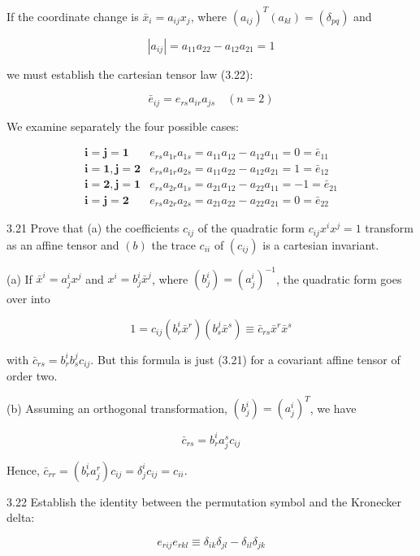 \documentclass[10pt]{article}
\begin{document}
If the coordinate change is $\bar{x}_{i}=a_{i j} x_{j}$, where $\left(a_{i j}\right)^{T}\left(a_{k l}\right)=\left(\delta_{p q}\right)$ and

$$
\left|a_{i j}\right|=a_{11} a_{22}-a_{12} a_{21}=1
$$

we must establish the cartesian tensor law (3.22):

$$
\bar{e}_{i j}=e_{r s} a_{i r} a_{j s} \quad(n=2)
$$

We examine separately the four possible cases:

$$
\begin{aligned}
\boldsymbol{i}=\boldsymbol{j}=\mathbf{1} & e_{r s} a_{1 r} a_{1 s}=a_{11} a_{12}-a_{12} a_{11}=0=\bar{e}_{11} \\
\boldsymbol{i}=\mathbf{1}, \boldsymbol{j}=\mathbf{2} & e_{r s} a_{1 r} a_{2 s}=a_{11} a_{22}-a_{12} a_{21}=1=\bar{e}_{12} \\
\boldsymbol{i}=\mathbf{2}, \boldsymbol{j}=\mathbf{1} & e_{r s} a_{2 r} a_{1 s}=a_{21} a_{12}-a_{22} a_{11}=-1=\bar{e}_{21} \\
\boldsymbol{i}=\boldsymbol{j}=\mathbf{2} & e_{r s} a_{2 r} a_{2 s}=a_{21} a_{22}-a_{22} a_{21}=0=\bar{e}_{22}
\end{aligned}
$$

3.21 Prove that (a) the coefficients $c_{i j}$ of the quadratic form $c_{i j} x^{i} x^{j}=1$ transform as an affine tensor and $(b)$ the trace $c_{i i}$ of $\left(c_{i j}\right)$ is a cartesian invariant.

(a) If $\bar{x}^{i}=a_{j}^{i} x^{j}$ and $x^{i}=b_{j}^{i} \bar{x}^{j}$, where $\left(b_{j}^{i}\right)=\left(a_{j}^{i}\right)^{-1}$, the quadratic form goes over into

$$
1=c_{i j}\left(b_{r}^{i} \bar{x}^{r}\right)\left(b_{s}^{j} \bar{x}^{s}\right) \equiv \bar{c}_{r s} \bar{x}^{r} \bar{x}^{s}
$$

with $\bar{c}_{r s}=b_{r}^{i} b_{s}^{j} c_{i j}$. But this formula is just (3.21) for a covariant affine tensor of order two.

(b) Assuming an orthogonal transformation, $\left(b_{j}^{i}\right)=\left(a_{j}^{i}\right)^{T}$, we have

$$
\bar{c}_{r s}=b_{r}^{i} a_{j}^{s} c_{i j}
$$

Hence, $\bar{c}_{r r}=\left(b_{r}^{i} a_{j}^{r}\right) c_{i j}=\delta_{j}^{i} c_{i j}=c_{i i}$.

3.22 Establish the identity between the permutation symbol and the Kronecker delta:


\begin{equation*}
e_{r i j} e_{r k l} \equiv \delta_{i k} \delta_{j l}-\delta_{i l} \delta_{j k} \tag{3.23}
\end{equation*}
\end{document}
